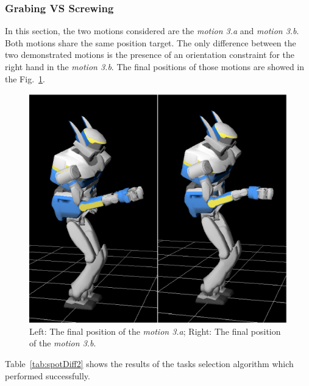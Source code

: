 \documentclass[letterpaper, 10pt, conference]{ieeeconf}      %
\begin{document}
\subsubsection{Grabing VS Screwing}
\label{sec:distinc2}
In this section, the two motions considered are the \emph{motion 3.a} and \emph{motion 3.b}.
Both motions share the same position target. The only difference between
the two demonstrated motions is the
presence of an orientation constraint for the right hand in the \emph{motion 3.b}.
The final positions of those motions are showed in the Fig.~\ref{fig:spotDiff2}.
\begin{figure}[t]
\begin{center}
\includegraphics[width=0.55\linewidth]{img/spotDiff2bis.ps}
\end{center}
\caption{Left: The final position of the \emph{motion 3.a}; Right: The final position of the \emph{motion 3.b}.}
\label{fig:spotDiff2}
\vspace{-3pt}
\end{figure}
Table~\ref{tab:spotDiff2} shows the results of the tasks selection algorithm which performed successfully.
\end{document}
